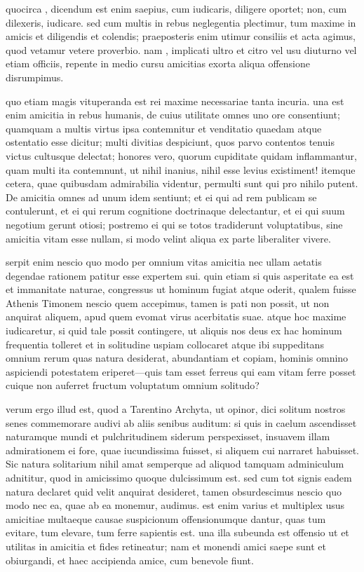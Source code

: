  quocirca , dicendum est enim saepius, cum iudicaris, diligere oportet; non, cum dilexeris, iudicare. sed cum multis in rebus neglegentia plectimur, tum maxime in amicis et diligendis et colendis; praeposteris enim utimur consiliis et acta agimus, quod vetamur vetere proverbio. nam , implicati ultro et citro vel usu diuturno vel etiam officiis, repente in medio cursu amicitias exorta aliqua offensione disrumpimus.

 quo etiam magis vituperanda est rei maxime necessariae tanta incuria. una est enim amicitia in rebus humanis, de cuius utilitate omnes uno ore consentiunt; quamquam a multis virtus ipsa contemnitur et venditatio quaedam atque ostentatio esse dicitur; multi divitias despiciunt, quos parvo contentos tenuis victus cultusque delectat; honores vero, quorum cupiditate quidam inflammantur, quam multi ita contemnunt, ut nihil inanius, nihil esse levius existiment! itemque cetera, quae quibusdam admirabilia videntur, permulti sunt qui pro nihilo putent. De amicitia omnes ad unum idem sentiunt; et ei qui ad rem publicam se contulerunt, et ei qui rerum cognitione doctrinaque delectantur, et ei qui suum negotium gerunt otiosi; postremo ei qui se totos tradiderunt voluptatibus, sine amicitia vitam esse nullam, si modo velint aliqua ex parte liberaliter vivere.

 serpit enim nescio quo modo per omnium vitas amicitia nec ullam aetatis degendae rationem patitur esse expertem sui. quin etiam si quis asperitate ea est et immanitate naturae, congressus ut hominum fugiat atque oderit, qualem fuisse Athenis Timonem nescio quem accepimus, tamen is pati non possit, ut non anquirat aliquem, apud quem evomat virus acerbitatis suae. atque hoc maxime iudicaretur, si quid tale possit contingere, ut aliquis nos deus ex hac hominum frequentia tolleret et in solitudine uspiam collocaret atque ibi suppeditans omnium rerum quas natura desiderat, abundantiam et copiam, hominis omnino aspiciendi potestatem eriperet—quis tam esset ferreus qui eam vitam ferre posset cuique non auferret fructum voluptatum omnium solitudo?

 verum ergo illud est, quod a Tarentino Archyta, ut opinor, dici solitum nostros senes commemorare audivi ab aliis senibus auditum: si quis in caelum ascendisset naturamque mundi et pulchritudinem siderum perspexisset, insuavem illam admirationem ei fore, quae iucundissima fuisset, si aliquem cui narraret habuisset. Sic natura solitarium nihil amat semperque ad aliquod tamquam adminiculum adnititur, quod in amicissimo quoque dulcissimum est. sed cum tot signis eadem natura declaret quid velit anquirat desideret, tamen obsurdescimus nescio quo modo nec ea, quae ab ea monemur, audimus. est enim varius et multiplex usus amicitiae multaeque causae suspicionum offensionumque dantur, quas tum evitare, tum elevare, tum ferre sapientis est. una illa subeunda est offensio ut et utilitas in amicitia et fides retineatur; nam et monendi amici saepe sunt et obiurgandi, et haec accipienda amice, cum benevole fiunt.

